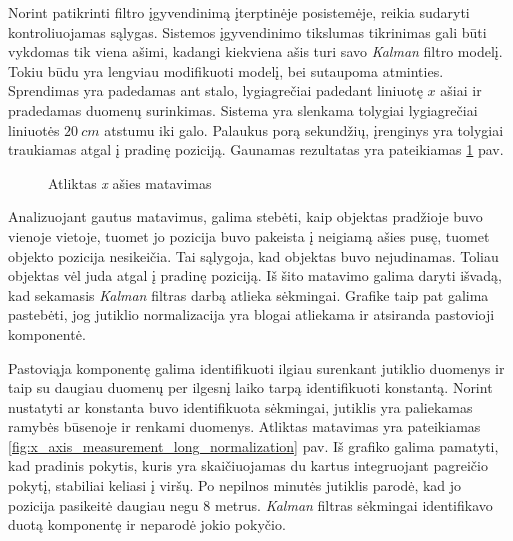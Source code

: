 Norint patikrinti filtro įgyvendinimą įterptinėje posistemėje, reikia sudaryti kontroliuojamas sąlygas.
Sistemos įgyvendinimo tikslumas tikrinimas gali būti vykdomas tik viena ašimi, kadangi kiekviena ašis turi savo \textit{Kalman} filtro modelį.
Tokiu būdu yra lengviau modifikuoti modelį, bei sutaupoma atminties.
Sprendimas yra padedamas ant stalo, lygiagrečiai padedant liniuotę $x$ ašiai ir pradedamas duomenų surinkimas.
Sistema yra slenkama tolygiai lygiagrečiai liniuotės $20~cm$ atstumu iki galo.
Palaukus porą sekundžių, įrenginys yra tolygiai traukiamas atgal į pradinę poziciją.
Gaunamas rezultatas yra pateikiamas \ref{fig:x_axis_measurement} pav.

\begin{figure}[b]
    \centering
    \caption{Atliktas \textit{x} ašies matavimas}
    \label{fig:x_axis_measurement}
\end{figure}

Analizuojant gautus matavimus, galima stebėti, kaip objektas pradžioje buvo vienoje vietoje, tuomet jo pozicija buvo pakeista į neigiamą ašies pusę, tuomet objekto pozicija nesikeičia.
Tai sąlygoja, kad objektas buvo nejudinamas.
Toliau objektas vėl juda atgal į pradinę poziciją.
Iš šito matavimo galima daryti išvadą, kad sekamasis \textit{Kalman} filtras darbą atlieka sėkmingai.
Grafike taip pat galima pastebėti, jog jutiklio normalizacija yra blogai atliekama ir atsiranda pastovioji komponentė.

Pastoviąja komponentę galima identifikuoti ilgiau surenkant jutiklio duomenys ir taip su daugiau duomenų per ilgesnį laiko tarpą identifikuoti konstantą.
Norint nustatyti ar konstanta buvo identifikuota sėkmingai, jutiklis yra paliekamas ramybės būsenoje ir renkami duomenys.
Atliktas matavimas yra pateikiamas \ref{fig:x_axis_measurement_long_normalization} pav.
Iš grafiko galima pamatyti, kad pradinis pokytis, kuris yra skaičiuojamas du kartus integruojant pagreičio pokytį, stabiliai keliasi į viršų.
Po nepilnos minutės jutiklis parodė, kad jo pozicija pasikeitė daugiau negu 8 metrus.
\textit{Kalman} filtras sėkmingai identifikavo duotą komponentę ir neparodė jokio pokyčio.

